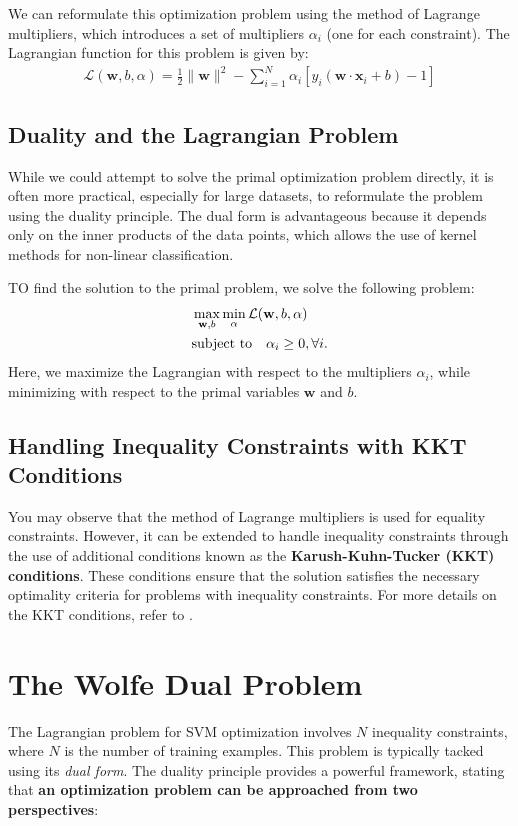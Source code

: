 We can reformulate this optimization problem using the method of Lagrange multipliers, which introduces a set of multipliers $\alpha_i$ (one for each constraint). The Lagrangian function for this problem is given by:
\begin{align*}
	\mathcal{L}(\mathbf{w}, b, \alpha) = \frac{1}{2}\lVert \mathbf{w}\rVert ^2 - \sum_{i=1}^N \alpha_i \left[y_i(\mathbf{w}\cdot \mathbf{x}_i+b)-1\right]
\end{align*}

\subsection{Duality and the Lagrangian Problem}

While we could attempt to solve the primal optimization problem directly, it is often more practical, especially for large datasets, to reformulate the problem using the duality principle. The dual form is advantageous because it depends only on the inner products of the data points, which allows the use of kernel methods for non-linear classification.

TO find the solution to the primal problem, we solve the following problem:
\begin{align*}
	&\max_{\mathbf{w}, b}\min_\alpha \mathcal{L}({\mathbf{w}}, b, \alpha)\\
	&\textrm{subject to}\quad \alpha_i\geq 0, \forall i.
\end{align*}
Here, we maximize the Lagrangian with respect to the multipliers $\alpha_i$, while minimizing with respect to the primal variables $\mathbf{w}$ and $b$.

\subsection{Handling Inequality Constraints with KKT Conditions}

You may observe that the method of Lagrange multipliers is used for equality constraints. However, it can be extended to handle inequality constraints through the use of additional conditions known as the \textbf{Karush-Kuhn-Tucker (KKT) conditions}. These conditions ensure that the solution satisfies the necessary optimality criteria for problems with inequality constraints. For more details on the KKT conditions, refer to . 

\section{The Wolfe Dual Problem}
The Lagrangian problem for SVM optimization involves $N$ inequality constraints, where $N$ is the number of training examples. This problem is typically tacked using its \textit{dual form}. The duality principle provides a powerful framework, stating that \textbf{an optimization problem can be approached from two perspectives}: 

